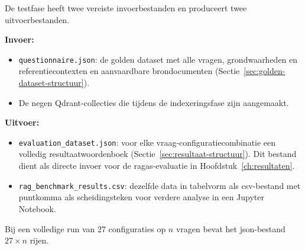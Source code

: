 De testfase heeft twee vereiste invoerbestanden en produceert twee uitvoerbestanden.

\textbf{Invoer:}
\begin{itemize}
  \item \texttt{questionnaire.json}: de golden dataset met alle vragen, grondwaarheden en referentiecontexten en aanvaardbare brondocumenten (Sectie~\ref{sec:golden-dataset-structuur}).
  \item De negen Qdrant-collecties die tijdens de indexeringsfase zijn aangemaakt.
\end{itemize}

\textbf{Uitvoer:}
\begin{itemize}
  \item \texttt{evaluation\_dataset.json}: voor elke vraag-configuratiecombinatie een volledig resultaatwoordenboek (Sectie~\ref{sec:resultaat-structuur}). Dit bestand dient als directe invoer voor de \gls{ragas}-evaluatie in Hoofdstuk~\ref{ch:resultaten}.
  \item \texttt{rag\_benchmark\_results.csv}: dezelfde data in tabelvorm als \gls{csv}-bestand met puntkomma als scheidingsteken voor verdere analyse in een Jupyter Notebook.
\end{itemize}

Bij een volledige run van 27 configuraties op $n$ vragen bevat het \gls{json}-bestand $27 \times n$ rijen.
